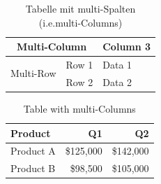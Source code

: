 \documentclass{scrartcl}
\begin{document}
\begin{table}
	\centering
	\caption{Tabelle mit multi-Spalten (i.e.multi-Columns)}
	\begin{tabular}{|l|l|l|} %
	
		\hline
		\multicolumn{2}{|c|}{Multi-Column} & Column 3 \\
		\hline
		\multirow{2}{*}{Multi-Row} & Row 1 & Data 1 \\
		\cline{2-3}
		& Row 2 & Data 2 \\
		\hline
	\end{tabular}   
\end{table}


\begin{table}
	\centering
	\caption{Table with multi-Columns}

\begin{tabular}{lrr}
	\toprule
	\textbf{Product} & \textbf{Q1} & \textbf{Q2} \\
	\midrule
	Product A & \$125,000 & \$142,000 \\
	Product B & \$98,500 & \$105,000 \\
	\bottomrule
\end{tabular}   
\end{table}   

%
\end{document}
